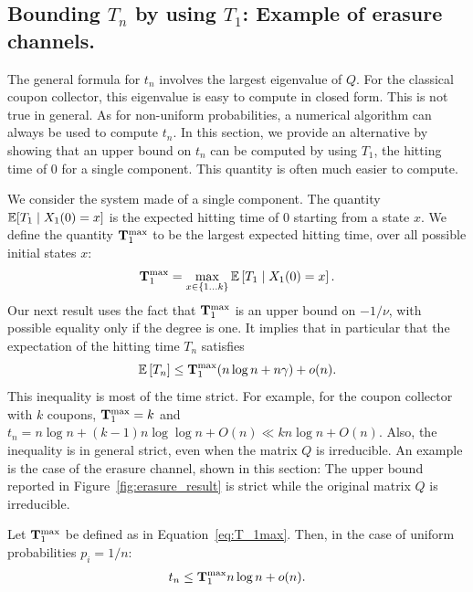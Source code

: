 \documentclass{aptpub}
\newcommand\expect[1]{\mathchoice{\bexpect{#1}}{\sexpect{#1}}{\sexpect{#1}}{\sexpect{#1}}}
\newcommand\bexpect[1]{\mathbb{E}\left[#1\right]}
\newcommand\sexpect[1]{\mathbb{E}[#1]}
\begin{document}
\subsection{Bounding $T_n$ by using $T_1$:  Example
  of erasure channels.}
\label{sec:erasure}


The general formula for $t_n$ involves the largest eigenvalue of $Q$.
For the classical coupon collector, this eigenvalue is easy to compute
in closed form.  This is not true in general. As for non-uniform
probabilities, a numerical algorithm can always be used to compute
$t_n$. In this section, we provide an alternative by showing that an
upper bound on $t_n$ can be computed by using $T_1$, the hitting time
of $0$ for a single component. This quantity is often much easier to
compute.

We consider the system made of  a single component. The quantity
$\expect{T_1\mid X_1(0)=x}$ is the expected hitting time of $0$
starting from a state $x$. We define the quantity ${\bf T}_1^{\max}$ to be
the largest expected hitting time, over  all possible initial states $x$:
\begin{equation}
  {\bf T}_1^{\max}=\max_{x\in\{1\dots k\}}\expect{T_1 \mid X_1(0)=x}.
  \label{eq:T_1max}
\end{equation}
Our next result uses the fact that ${\bf T}_1^{\max}$ is an upper
bound on $-1/\nu$, with possible equality only if the degree is
one. It implies that in particular that the expectation of the hitting
time $T_n$ satisfies
\begin{equation}
  \expect{T_n}\le {\bf T}_1^{\max}(n\log n + n\gamma) + o(n). 
  \label{eq:absorbing_bound}
\end{equation} 
This inequality is most of the time strict. For example, for the
coupon collector with $k$ coupons, ${\bf T}_1^{\max}=k$ and
$t_n=n\log n + (k-1)n\log\log n +O(n) \ll kn\log n+O(n)$.  Also, the
inequality is in general strict, even when the matrix $Q$ is
irreducible. An example is the case of the erasure channel, shown in
this section: The upper bound reported in
Figure~\ref{fig:erasure_result} is strict while the original matrix
$Q$ is irreducible.
\begin{thm}
  \label{th:absorbing_bound}
  Let ${\bf T}_1^{\max}$ be defined as in
  Equation~\eqref{eq:T_1max}. Then, in the case of uniform probabilities
  $p_i=1/n$:
  \begin{align*}
    t_n \le {\bf T}_1^{\max} n \log n + o(n). 
  \end{align*}
\end{thm}
\end{document}
